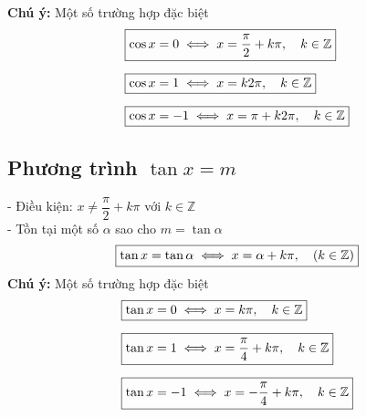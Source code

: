 \noindent\textbf{Chú ý:} Một số trường hợp đặc biệt
\noindent\hspace*{1cm}
\[
    \begin{aligned}
        &\fbox{$\cos x = 0 \iff x = \dfrac{\pi}{2} + k\pi, \quad k \in \mathbb{Z}$}\\[6pt]
        &\fbox{$\cos x = 1 \iff x = k2\pi, \quad k \in \mathbb{Z}$}\\[6pt]
        &\fbox{$\cos x = -1 \iff x = \pi + k2\pi, \quad k \in \mathbb{Z}$}
    \end{aligned}
\]

\subsection{Phương trình $\tan x = m$}
\noindent\hspace*{1cm}- Điều kiện: $x \neq \dfrac{\pi}{2} + k\pi$ với $k \in \mathbb{Z}$\\[6pt]
\noindent\hspace*{1cm}- Tồn tại một số $\alpha$ sao cho $m = \tan \alpha$
\[
    \begin{aligned}
        \fbox{$
            \tan x = \tan \alpha \iff x = \alpha + k\pi, 
            \quad 
            \left(
                k \in \mathbb{Z}
            \right)      
        $}
    \end{aligned}
\]
\noindent\textbf{Chú ý:} Một số trường hợp đặc biệt
\noindent\hspace*{1cm}
\[
    \begin{aligned}
        &\fbox{$\tan x = 0 \iff x = k\pi, \quad k \in \mathbb{Z}$}\\[6pt]
        &\fbox{$\tan x = 1 \iff x = \dfrac{\pi}{4} + k\pi, \quad k \in \mathbb{Z}$}\\[6pt]
        &\fbox{$\tan x = -1 \iff x = -\dfrac{\pi}{4} + k\pi, \quad k \in \mathbb{Z}$}
    \end{aligned}
\]

